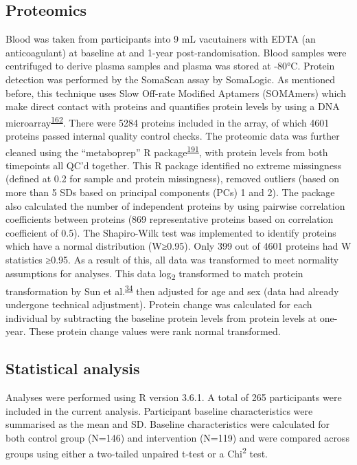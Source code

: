 \documentclass[11pt,twoside]{bristolthesis}
\begin{document}
\hypertarget{proteomics}{%
\subsection{Proteomics}\label{proteomics}}

Blood was taken from participants into 9 mL vacutainers with EDTA (an anticoagulant) at baseline at and 1-year post-randomisation. Blood samples were centrifuged to derive plasma samples and plasma was stored at -80°C. Protein detection was performed by the SomaScan assay by SomaLogic. As mentioned before, this technique uses Slow Off-rate Modified Aptamers (SOMAmers) which make direct contact with proteins and quantifies protein levels by using a DNA microarray\textsuperscript{\protect\hyperlink{ref-Rohloff2014}{162}}. There were 5284 proteins included in the array, of which 4601 proteins passed internal quality control checks. The proteomic data was further cleaned using the ``metaboprep'' R package\textsuperscript{\protect\hyperlink{ref-Hughes2021}{191}}, with protein levels from both timepoints all QC'd together. This R package identified no extreme missingness (defined at 0.2 for sample and protein missingness), removed outliers (based on more than 5 SDs based on principal components (PCs) 1 and 2). The package also calculated the number of independent proteins by using pairwise correlation coefficients between proteins (869 representative proteins based on correlation coefficient of 0.5). The Shapiro-Wilk test was implemented to identify proteins which have a normal distribution (W≥0.95). Only 399 out of 4601 proteins had W statistics ≥0.95. As a result of this, all data was transformed to meet normality assumptions for analyses. This data log\textsubscript{2} transformed to match protein transformation by Sun et al.\textsuperscript{\protect\hyperlink{ref-Sun2018}{34}} then adjusted for age and sex (data had already undergone technical adjustment). Protein change was calculated for each individual by subtracting the baseline protein levels from protein levels at one-year. These protein change values were rank normal transformed.

\hypertarget{statistical-analysis-1}{%
\subsection{Statistical analysis}\label{statistical-analysis-1}}

Analyses were performed using R version 3.6.1. A total of 265 participants were included in the current analysis. Participant baseline characteristics were summarised as the mean and SD. Baseline characteristics were calculated for both control group (N=146) and intervention (N=119) and were compared across groups using either a two-tailed unpaired t-test or a Chi\textsuperscript{2} test.
\end{document}
